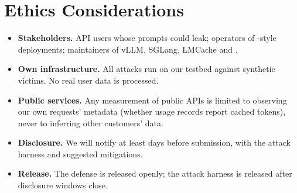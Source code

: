 \section{Ethics Considerations}
\label{app:ethics}

\begin{itemize}
\item \textbf{Stakeholders.} API users whose prompts could leak; operators of
  \mc-style deployments; maintainers of vLLM, SGLang, LMCache and \mc.
\item \textbf{Own infrastructure.} All attacks run on our testbed against
  synthetic victims. No real user data is processed.
\item \textbf{Public services.} Any measurement of public APIs is limited to
  observing our own requests' metadata (\eg whether usage records report
  cached tokens), never to inferring other customers' data. 
\item \textbf{Disclosure.} We will notify  at least  days before submission, with the attack
  harness and suggested mitigations.
\item \textbf{Release.} The defense is released openly; the attack harness is
  released after disclosure windows close.
\end{itemize}
